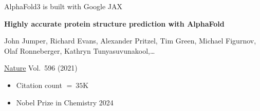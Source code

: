 \begin{frame}
    
    \Eg AlphaFold3 is built with Google JAX

        \vspace{0.5em}

    \begin{figure}
       \begin{center} %
       \end{center}
    \end{figure}


\end{frame}

\begin{frame}
    
    \textbf{Highly accurate protein structure prediction with AlphaFold}

        \vspace{0.5em}
    John Jumper, Richard Evans, Alexander Pritzel, Tim Green, Michael Figurnov,
    Olaf Ronneberger, Kathryn Tunyasuvunakool,\ldots 

        \vspace{0.5em}
    \underline{Nature} Vol.\ 596 (2021)

    \vspace{0.5em}
    \vspace{0.5em}
    \vspace{0.5em}
    \vspace{0.5em}
    \begin{itemize}
        \item Citation count $= ~35$K
        \vspace{0.5em}
        \item Nobel Prize in Chemistry 2024
    \end{itemize}

\end{frame}


